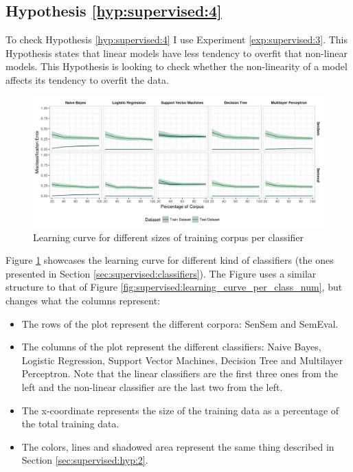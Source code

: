 \subsection{Hypothesis \ref{hyp:supervised:4}}\label{sec:supervised:hyp:4}

To check Hypothesis \ref{hyp:supervised:4} I use Experiment
\ref{exp:supervised:3}. This Hypothesis states that linear models have less
tendency to overfit that non-linear models. This Hypothesis is looking to
check whether the non-linearity of a model affects its tendency to overfit the
data.

\begin{figure}[ht]
	\includegraphics[width=\textwidth]{plots/supervised/learning_curve_per_classifier}
  \caption{Learning curve for different sizes of training corpus per classifier}
  \label{fig:supervised:learning_curve_per_classifier}
\end{figure}

Figure \ref{fig:supervised:learning_curve_per_classifier} showcases the
learning curve for different kind of classifiers (the ones presented in Section
\ref{sec:supervised:classifiers}). The Figure uses a similar structure to that
of Figure \ref{fig:supervised:learning_curve_per_class_num}, but changes what
the columns represent:

\begin{itemize}
  \item The rows of the plot represent the different corpora: SenSem and
    SemEval.
  \item The columns of the plot represent the different classifiers: Naive
    Bayes, Logistic Regression, Support Vector Machines, Decision Tree and
    Multilayer Perceptron. Note that the linear classifiers are the first
    three ones from the left and the non-linear classifier are the last two
    from the left.
  \item The x-coordinate represents the size of the training data as a
    percentage of the total training data.
  \item The colors, lines and shadowed area represent the same thing described
    in Section \ref{sec:supervised:hyp:2}.
\end{itemize}

